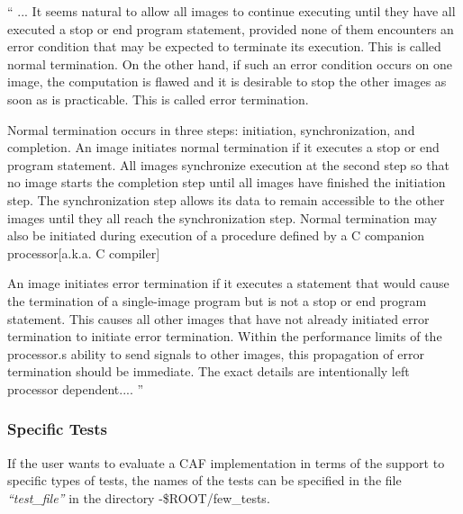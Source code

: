 {\small `` ... It seems natural to allow all images to continue executing until they have all executed a stop or end program
statement, provided
  none of them encounters an error condition that may be
expected to terminate its execution. This is called normal
termination.
  On the other hand, if such an error condition occurs on one
image, the computation is flawed and it is desirable to stop
  the other images as soon as is practicable. This is called
error termination.

Normal termination occurs in three steps: initiation,
synchronization, and completion. An image
  initiates normal termination if it executes a stop or end
program statement. All images synchronize execution at the
  second step so that no image starts the completion step until
all images have finished the initiation step. The
  synchronization step allows its data to remain accessible to
the other images until they all reach the synchronization step.
  Normal termination may also be initiated during execution of a
procedure defined by a C companion processor[a.k.a. C compiler]

An image initiates error termination if it executes a
statement that
  would cause the termination of a single-image program but is
not a stop or end program statement. This causes all other
  images that have not already initiated error termination to
initiate error termination. Within the performance limits of
  the processor.s ability to send signals to other images, this
propagation of error termination should be immediate. The
  exact details are intentionally left processor dependent.... ''
}

\subsubsection{Specific Tests}
If the user wants to evaluate a CAF implementation in terms of
the support to specific types of tests, the names of the tests
can be specified in the file \emph{``test\_file''} in the directory -\$ROOT/few\_tests.

